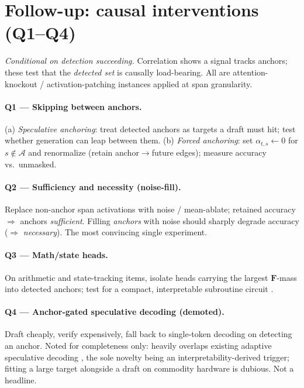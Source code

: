 \documentclass[11pt]{article}
\newcommand{\F}{\mathbf{F}}
\begin{document}
\section{Follow-up: causal interventions (Q1--Q4)}
\label{sec:followups}
\emph{Conditional on detection succeeding.} Correlation shows a signal tracks anchors; these test that
the \emph{detected set} is causally load-bearing. All are attention-knockout / activation-patching
instances \cite{rai2024how,wang2023interpretability,meng2022locating} applied at span granularity.

\paragraph{Q1 --- Skipping between anchors.}
(a) \emph{Speculative anchoring}: treat detected anchors as targets a draft must hit; test whether
generation can leap between them. (b) \emph{Forced anchoring}: set $\alpha_{t,s}\!\leftarrow\!0$ for
$s\notin\mathcal A$ and renormalize (retain anchor$\to$future edges); measure accuracy vs.\ unmasked.

\paragraph{Q2 --- Sufficiency and necessity (noise-fill).}
Replace non-anchor span activations with noise / mean-ablate; retained accuracy $\Rightarrow$ anchors
\emph{sufficient}. Filling \emph{anchors} with noise should sharply degrade accuracy
($\Rightarrow$ \emph{necessary}). The most convincing single experiment.

\paragraph{Q3 --- Math/state heads.}
On arithmetic and state-tracking items, isolate heads carrying the largest $\F$-mass into detected
anchors; test for a compact, interpretable subroutine circuit \cite{rai2024how}.

\paragraph{Q4 --- Anchor-gated speculative decoding (demoted).}
Draft cheaply, verify expensively, fall back to single-token decoding on detecting an anchor. Noted for
completeness only: heavily overlaps existing adaptive speculative decoding
\cite{leviathan2023fast,liao2025reward}, the sole novelty being an interpretability-derived trigger;
fitting a large target alongside a draft on commodity hardware is dubious. Not a headline.
\end{document}
